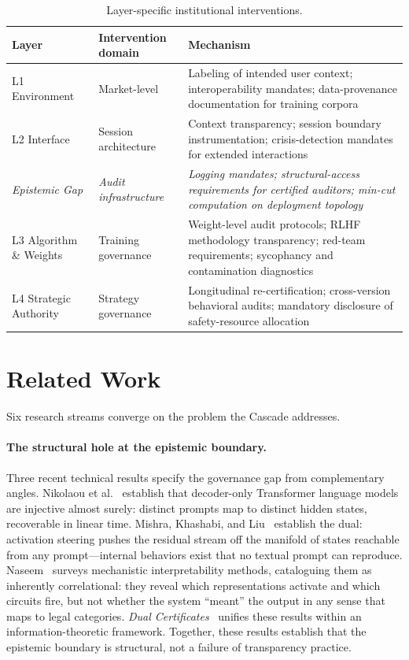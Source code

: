 \documentclass[11pt]{article}
\begin{document}
\begin{table}[!htbp]
\centering
\small
\caption{Layer-specific institutional interventions.}
\label{tab:interventions}
{\setlength{\tabcolsep}{4pt}
\begin{tabularx}{\columnwidth}{@{}P{1.4cm}P{3.1cm}Y@{}}
\toprule
\textbf{Layer} & \textbf{Intervention domain} & \textbf{Mechanism} \\
\midrule
L1 Environment & Market-level & Labeling of intended user context; interoperability mandates; data-provenance documentation for training corpora \\
L2 Interface & Session architecture & Context transparency; session boundary instrumentation; crisis-detection mandates for extended interactions \\
\textit{Epistemic Gap} & \textit{Audit infrastructure} & \textit{Logging mandates; structural-access requirements for certified auditors; min-cut computation on deployment topology} \\
L3 Algorithm \& Weights & Training governance & Weight-level audit protocols; RLHF methodology transparency; red-team requirements; sycophancy and contamination diagnostics \\
L4 Strategic Authority & Strategy governance & Longitudinal re-certification; cross-version behavioral audits; mandatory disclosure of safety-resource allocation \\
\bottomrule
\end{tabularx}}
\end{table}

\section{Related Work}\label{sec:related}

Six research streams converge on the problem the Cascade addresses.

\paragraph{The structural hole at the epistemic boundary.} Three recent technical results specify the governance gap from complementary angles. Nikolaou et al.~\cite{nikolaou2025injective} establish that decoder-only Transformer language models are injective almost surely: distinct prompts map to distinct hidden states, recoverable in linear time. Mishra, Khashabi, and Liu~\cite{mishra2026steered} establish the dual: activation steering pushes the residual stream off the manifold of states reachable from any prompt---internal behaviors exist that no textual prompt can reproduce. Naseem~\cite{naseem2026mechanistic} surveys mechanistic interpretability methods, cataloguing them as inherently correlational: they reveal which representations activate and which circuits fire, but not whether the system ``meant'' the output in any sense that maps to legal categories. \textit{Dual Certificates}~\cite{anon2026dual} unifies these results within an information-theoretic framework. Together, these results establish that the epistemic boundary is structural, not a failure of transparency practice.
\end{document}
